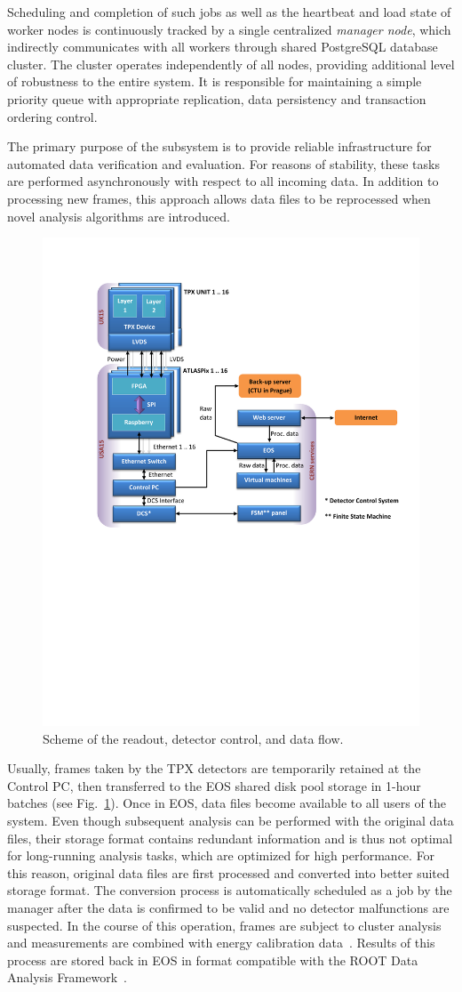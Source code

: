 \documentclass[conference]{IEEEtran}
\begin{document}
Scheduling and completion of such jobs as well as the heartbeat and load state of worker nodes is continuously tracked by a single centralized \textit{manager node}, which indirectly communicates with all workers through shared PostgreSQL database cluster. The cluster operates independently of all nodes, providing additional level of robustness to the entire system. It is responsible for maintaining a simple priority queue with appropriate replication, data persistency and transaction ordering control.

The primary purpose of the subsystem is to provide reliable infrastructure for automated data verification and evaluation. For reasons of stability, these tasks are performed asynchronously with respect to all incoming data. In addition to processing new frames, this approach allows data files to be reprocessed when novel analysis algorithms are introduced.

\begin{figure}[tbp]
	\centering
        \includegraphics[clip, trim={2cm 11.2cm 0cm 2.6cm}, width=.5\textwidth, angle = 0 ]{Plots/Doc1.pdf}
      \caption {Scheme of the readout, detector control, and data flow.}
    \label{fig:data_flow}
\end{figure}

Usually, frames taken by the TPX detectors are temporarily retained at the Control PC, then transferred to the EOS shared disk pool storage in 1-hour batches (see Fig.~\ref{fig:data_flow}). Once in EOS, data files become available to all users of the system. Even though subsequent analysis can be performed with the original data files, their storage format contains redundant information and is thus not optimal for long-running analysis tasks, which are optimized for high performance. For this reason, original data files are first processed and converted into better suited storage format. The conversion process is automatically scheduled as a job by the manager after the data is confirmed to be valid and no detector malfunctions are suspected. In the course of this operation, frames are subject to cluster analysis~\cite{Holy2008} and measurements are combined with energy calibration data~\cite{Jakubek2011}. Results of this process are stored back in EOS in format compatible with the ROOT Data Analysis Framework~\cite{ROOT}.
\end{document}
